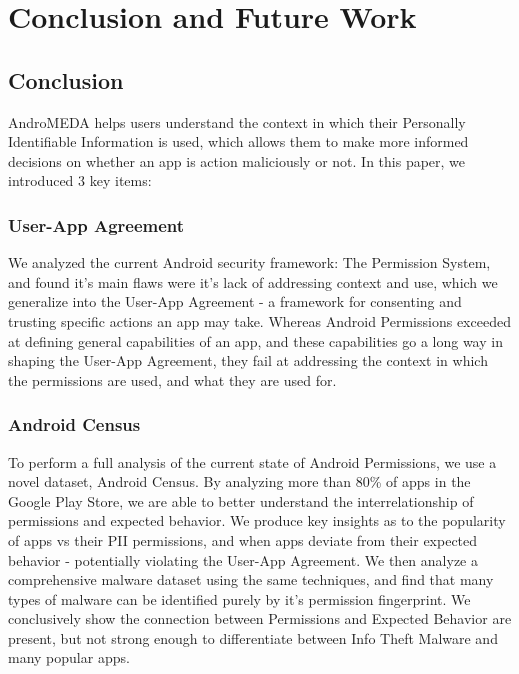 \chapter{Conclusion and Future Work}
\label{sec:conclusion}
\section{Conclusion}
AndroMEDA helps users understand the context in which their Personally Identifiable Information is used, which allows them to make more informed decisions on whether an app is action maliciously or not. In this paper, we introduced 3 key items:

\subsection{User-App Agreement}

We analyzed the current Android security framework: The Permission System, and found it's main flaws were it's lack of addressing context and use, which we generalize into the User-App Agreement - a framework for consenting and trusting specific actions an app may take. Whereas Android Permissions exceeded at defining general capabilities of an app, and these capabilities go a long way in shaping the User-App Agreement, they fail at addressing the context in which the permissions are used, and what they are used for.

\subsection{Android Census}
To perform a full analysis of the current state of Android Permissions, we use a novel dataset, Android Census. By analyzing more than 80\% of apps in the Google Play Store, we are able to better understand the interrelationship of permissions and expected behavior. We produce key insights as to the popularity of apps vs their PII permissions, and when apps deviate from their expected behavior - potentially violating the User-App Agreement. We then analyze a comprehensive malware dataset using the same techniques, and find that many types of malware can be identified purely by it's permission fingerprint. We conclusively show the connection between Permissions and Expected Behavior are present, but not strong enough to differentiate between Info Theft Malware and many popular apps.

